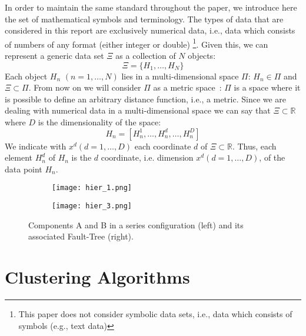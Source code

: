 In order to maintain the same standard throughout the paper, we introduce here the set of mathematical symbols 
and terminology. The types of data that are considered in this report are exclusively numerical data, i.e., 
data which consists of numbers of any format (either integer or double)
\footnote{This paper does not consider symbolic data sets, i.e., data which consists of symbols (e.g., text data)}. 
Given this,
we can represent a generic data set $\Xi$ as a collection of $N$ objects:
\begin{equation}
  \Xi = \{ H_1,\ldots,H_N \}  
  \label{eq:collection}
\end{equation}
Each object $H_n$ $(n=1,\ldots,N)$ lies in a multi-dimensional space $\Pi$: $H_n \in \Pi$ and $\Xi \subset \Pi$. 
From now on we will consider $\Pi$ 
as a metric space~\cite{}: $\Pi$ is a space where it is possible to define an arbitrary distance function, i.e., a 
metric.
Since we are dealing with numerical data in a multi-dimensional space we can say that $\Xi \subset \mathbb{R}$ 
where $D$ is the dimensionality of the space:
\begin{equation}
  H_n=[H_n^1,\ldots,H_n^d,\ldots,H_n^D ]
  \label{eq:collection_upd}
\end{equation}
We indicate with $x^d  (d=1,\ldots,D)$ each coordinate $d$ of $\Xi \subset \mathbb{R}$. 
Thus, each element $H_n^d$ of $H_n$ is the 
$d$ coordinate, i.e. dimension $x^d (d=1,\ldots,D)$, of the data point $H_n$.

\begin{figure}
  \centering
  \begin{subfigure}{.5\textwidth}
    \centering
    \texttt{[image: hier\_1.png]}
    \label{fig:sub1}
  \end{subfigure}%
  \begin{subfigure}{.5\textwidth}
    \centering
    \texttt{[image: hier\_3.png]}
    \label{fig:ABsystem}
  \end{subfigure}
  \caption{Components A and B in a series configuration (left) and its associated Fault-Tree (right).}
  \label{fig:ABsystem}
\end{figure}

\section{Clustering Algorithms}
\label{sec:clusteringAlgorithms}

